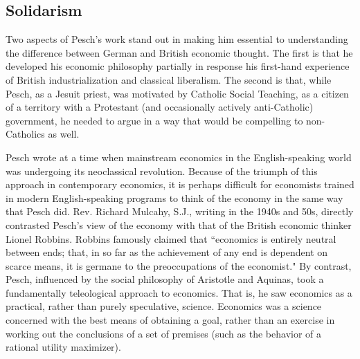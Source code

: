 \documentclass{article}
\begin{document}
\subsection{Solidarism}

Two aspects of Pesch’s work stand out in making him essential to understanding the difference between German and British economic thought.  The first is that he developed his economic philosophy partially in response his first-hand experience of British industrialization and classical liberalism.  The second is that, while Pesch, as a Jesuit priest, was motivated by Catholic Social Teaching, as a citizen of a territory with a Protestant (and occasionally actively anti-Catholic) government, he needed to argue in a way that would be compelling to non-Catholics as well.\medskip

Pesch wrote at a time when mainstream economics in the English-speaking world was undergoing its neoclassical revolution.  Because of the triumph of this approach in contemporary economics, it is perhaps difficult for economists trained in modern English-speaking programs to think of the economy in the same way that Pesch did.  Rev. Richard Mulcahy, S.J., writing in the 1940s and 50s, directly contrasted Pesch’s view of the economy with that of the British economic thinker Lionel Robbins. \citep{mulcahy1949}  Robbins famously claimed that ``economics is entirely neutral between ends; that, in so far as the achievement of any end is dependent on scarce means, it is germane to the preoccupations of the economist." \citep[p.23]{robbins1932}  By contrast, Pesch, influenced by the social philosophy of Aristotle and Aquinas, took a fundamentally teleological approach to economics.  That is, he saw economics as a practical, rather than purely speculative, science.  Economics was a science concerned with the best means of obtaining a goal, rather than an exercise in working out the conclusions of a set of premises (such as the behavior of a rational utility maximizer).\medskip
\end{document}
